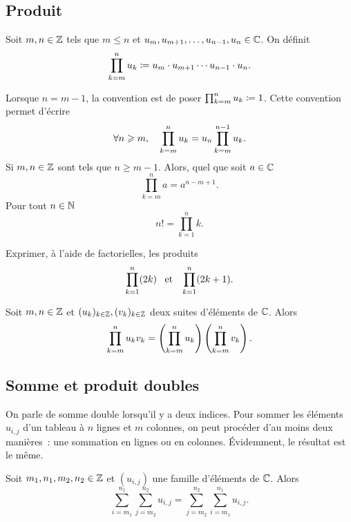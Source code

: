 \documentclass{magnolia}
\begin{document}
\subsection{Produit}

\begin{definition}[utile=-3]
Soit $m,n\in\mathbb{Z}$ tels que $m\leq n$ et $u_{m},u_{m+1},\ldots,u_{n-1},u_n\in\mathbb{C}$. On
définit
\[\prod_{k=m}^n u_k\coloneqq u_{m}\cdot u_{m+1}\cdots u_{n-1}\cdot u_n.\]
\end{definition}

\begin{remarques}
\remarque Lorsque $n=m-1$, la convention est de poser $\prod_{k=m}^n u_k\coloneqq 1$. Cette
  convention permet d'écrire
  \[\forall n\geqslant m,\quad \prod_{k=m}^n u_k = u_n  \prod_{k=m}^{n-1} u_k.\]
\remarque Si $m,n\in\mathbb{Z}$ sont tels que $n\geq m-1$. Alors, quel que soit $a\in\mathbb{C}$
  \[\prod_{k=m}^{n} a =a^{n-m+1}.\]
\remarque Pour tout $n\in\mathbb{N}$
   \[n!=\prod_{k=1}^n k.\]
\end{remarques}

\begin{exoUnique}
\exo Exprimer, à l'aide de factorielles, les produits
  \[\prod_{k=1}^n (2k) \quad\!\text{et}\quad\! \prod_{k=1}^n (2k+1).\]
\end{exoUnique}

\begin{proposition}
Soit $m,n\in\mathbb{Z}$ et $(u_k)_{k\in\mathbb{Z}}, (v_k)_{k\in\mathbb{Z}}$ deux suites d'éléments de $\mathbb{C}$. Alors
\[\prod_{k=m}^n u_k v_k=\left(\prod_{k=m}^n u_k\right) \left(\prod_{k=m}^n v_k\right).\]
\end{proposition}

\subsection{Somme et produit doubles}

On parle de somme double lorsqu'il y a deux indices. Pour sommer les éléments
$u_{i,j}$ d'un tableau à $n$ lignes et $m$ colonnes, on peut procéder d'au
moins deux manières~: une sommation en lignes ou en colonnes. Évidemment, le résultat est le même. 

\begin{proposition}
Soit $m_1,n_1,m_2,n_2\in\mathbb{Z}$ et $(u_{i,j})$ une famille d'éléments de $\mathbb{C}$. Alors
\[\sum_{i=m_1}^{n_1} \sum_{j=m_2}^{n_2} u_{i, j} =
\sum_{j=m_2}^{n_2} \sum_{i=m_1}^{n_1} u_{i, j}.\]
\end{proposition}
\end{document}
